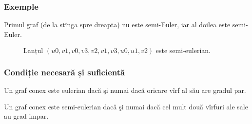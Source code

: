 \begin{frame}
  \frametitle{Exemple}

\begin{figure}
\centering%
\end{figure}
\pause

Primul graf (de la stînga spre dreapta) nu este semi-Euler, iar al doilea este semi-Euler. 
\pause

\begin{figure}
\centering%
\caption{Lanțul $(u0,v1,v0,v3,v2,v1,v3,u0,u1,v2)$ este semi-eulerian.}
\end{figure}

\end{frame}


\begin{frame}
  \frametitle{Condiție necesară și suficientă}

\begin{theorem}[Euler]
Un graf conex este eulerian dacă şi numai dacă oricare vîrf al său are gradul par.
\end{theorem}
\pause

\begin{theorem}
Un graf conex este semi-eulerian dacă şi numai dacă cel mult două vîrfuri ale sale au grad impar.
\end{theorem}

\end{frame}

